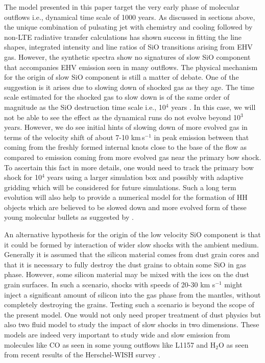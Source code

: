 \documentclass[useAMS,usenatbib,letters]{mn2e}
\begin{document}
The model presented in this paper target the very early phase of molecular
outflows i.e., dynamical time scale of 1000 years.
As discussed in sections above, the unique combination of pulsating
jet with chemistry and cooling followed by non-LTE radiative transfer
calculations has shown success in fitting the line shapes, integrated intensity and line ratios of SiO
transitions arising from EHV gas. However, the synthetic spectra show
no signatures of slow SiO component that accompanies EHV emission seen
in many outflows. The physical mechanism for the origin of slow SiO component is still a matter
of debate. One of the suggestion is it arises due to slowing down of
shocked gas as they age. The time scale estimated for the shocked gas
to slow down is of the same order of magnitude as the SiO destruction
time scale i.e., 10$^{4}$ years \cite{Codella:1999p12584}. In this
case, we will not be able to see the effect as the dynamical runs do
not evolve beyond 10$^{3}$ years. However, we do see initial 
hints of slowing down of more evolved gas in terms of the velocity
shift of about 7-10 km\,s$^{-1}$ in peak emission between that
coming from the freshly formed internal knots close to the base of the
flow as compared to emission coming from more evolved gas near the
primary bow shock. To ascertain this fact in more details, one would
need to track the primary bow shock for 10$^{4}$ years
using a larger simulation box and possibly with adaptive gridding 
which will be considered for future simulations. Such a long term
evolution will also help to provide a numerical model for the formation of HH objects
which are believed to be slowed down and more evolved form of these
young molecular bullets as suggested by \cite{Norman:1979p14858,
  Hartigan:1987p11178}.
%

An alternative hypothesis for the origin of the low velocity SiO
component is that it could be formed by interaction of wider slow
shocks with the ambient medium. Generally it is assumed that the silicon material comes from dust
grain cores and that it is necessary to fully destroy the dust grains
to obtain some SiO in gas phase. However, some silicon material may be
mixed with the ices on the dust grain surfaces. In such a scenario, 
shocks with speeds of 20-30 km s$^{-1}$ might inject a significant
amount of silicon into the gas phase from the mantles, without 
completely destroying the grains. Testing such a scenario is beyond
the scope of the present model. One would not only need proper
treatment of dust physics but also two fluid model to study the impact
of slow shocks in two dimensions. These models are indeed very
important to study wide and slow emission from molecules like CO 
as seen in some young outflows like L1157 \cite{GomezRuiz:2013p14549}
and H$_{2}$O as seen from recent results of the Herschel-WISH survey
\cite{Tafalla:2013p12586}.
\end{document}
